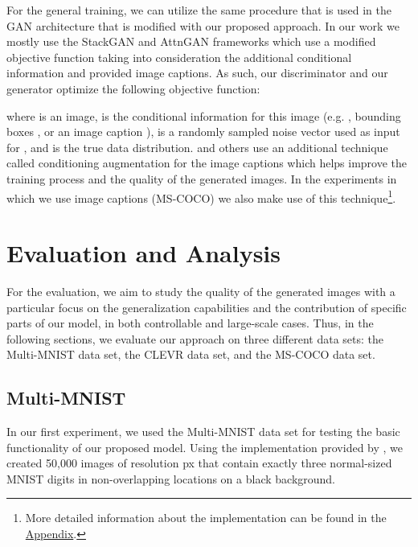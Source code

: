 \documentclass{article} \usepackage{iclr2019_conference,times}
\begin{document}
	For the general training, we can utilize the same procedure that is used in the GAN architecture that is modified with our proposed approach.
	In our work we mostly use the StackGAN \citep{zhang2017stackgan++} and AttnGAN \citep{xu2017attngan} frameworks which use a modified objective function taking into consideration the additional conditional information and provided image captions.
	As such, our discriminator  and our generator  optimize the following objective function:
	
	where  is an image,  is the conditional information for this image (e.g. , bounding boxes , or an image caption ),  is a randomly sampled noise vector used as input for , and  is the true data distribution.
	\cite{zhang2017stackgan++} and others use an additional technique called conditioning augmentation for the image captions which helps improve the training process and the quality of the generated images.
	In the experiments in which we use image captions (MS-COCO) we also make use of this technique\footnote{More detailed information about the implementation can be found in the \hyperref[app:implementation:details]{Appendix}.}.
	
	\section{Evaluation and Analysis}
	For the evaluation, we aim to study the quality of the generated images with a particular focus on the generalization capabilities and the contribution of specific parts of our model, in both controllable and large-scale cases.
	Thus, in the following sections, we evaluate our approach on three different data sets: the Multi-MNIST data set, the CLEVR data set, and the MS-COCO data set.
	
	\subsection{Multi-MNIST}
	In our first experiment, we used the Multi-MNIST data set \citep{eslami2016attend} for testing the basic functionality of our proposed model.
	Using the implementation provided by \cite{eslami2016attend}, we created 50,000 images of resolution  px that contain exactly three normal-sized MNIST digits in non-overlapping locations on a black background.
	
\end{document}
